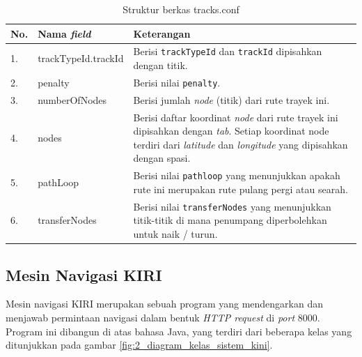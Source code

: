 \begin{table}
	\caption{Struktur berkas tracks.conf}
	\label{tab:2_struktur_tracks_conf}
	\begin{tabular}{|p{0.5cm}|p{3.5cm}|p{11cm}|}
		\hline
		No. & Nama \textit{field} & Keterangan \\
		\hline
		1. & trackTypeId.trackId & Berisi \verb/trackTypeId/ dan \verb/trackId/ dipisahkan dengan titik. \\
		2. & penalty & Berisi nilai \verb/penalty/. \\
		3. & numberOfNodes & Berisi jumlah \textit{node} (titik) dari rute trayek ini. \\
		4. & nodes & Berisi daftar koordinat \textit{node} dari rute trayek ini dipisahkan dengan \textit{tab}. Setiap koordinat node terdiri dari \textit{latitude} dan \textit{longitude} yang dipisahkan dengan spasi. \\
		5. & pathLoop & Berisi nilai \verb/pathloop/ yang menunjukkan apakah rute ini merupakan rute pulang pergi atau searah. \\
		6. & transferNodes & Berisi nilai \verb/transferNodes/ yang menunjukkan titik-titik di mana penumpang diperbolehkan untuk naik / turun. \\
		\hline
	\end{tabular}
\end{table}

\subsection{Mesin Navigasi KIRI}

Mesin navigasi KIRI merupakan sebuah program yang mendengarkan dan menjawab permintaan navigasi dalam bentuk \textit{HTTP request} di \textit{port} 8000. Program ini dibangun di atas bahasa Java, yang terdiri dari beberapa kelas yang ditunjukkan pada gambar \ref{fig:2_diagram_kelas_sistem_kini}.

